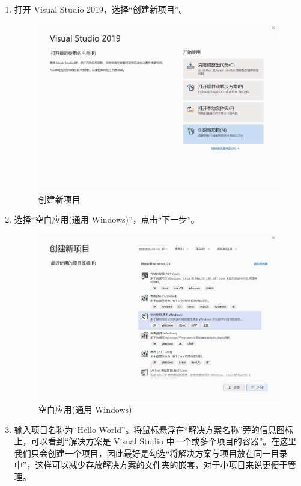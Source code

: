\begin{enumerate}
    \item 打开 Visual Studio 2019，选择``创建新项目''。
    \begin{figure}[htbp]
        \centering
        \includegraphics[width = 0.5\paperwidth]{pic/2.png}
        \caption{创建新项目}
    \end{figure}

    \item 选择``空白应用(通用 Windows)''，点击``下一步''。
    \begin{figure}[htbp]
        \centering
        \includegraphics[width = 0.5\paperwidth]{pic/3.png}
        \caption{空白应用(通用 Windows)}
    \end{figure}

    \item 输入项目名称为``Hello World''。将鼠标悬浮在``解决方案名称''旁的信息图标上，可以看到``解决方案是 Visual Studio 中一个或多个项目的容器''。在这里我们只会创建一个项目，因此最好是勾选``将解决方案与项目放在同一目录中''，这样可以减少存放解决方案的文件夹的嵌套，对于小项目来说更便于管理。


\end{enumerate}
